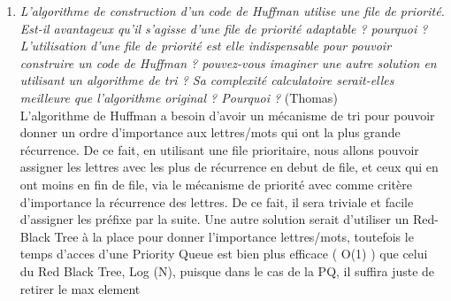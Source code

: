 \documentclass[11pt]{article}
\begin{document}
\begin{enumerate}
\item \textit{L'algorithme de construction d'un code de Huffman utilise une file de priorité. Est-il avantageux qu'il s'agisse d'une file de priorité adaptable ? pourquoi ? L'utilisation d'une file de priorité est elle indispensable pour pouvoir construire un code de Huffman ? pouvez-vous imaginer une autre solution en utilisant un algorithme de tri ? Sa complexité calculatoire serait-elles meilleure que l'algorithme original ? Pourquoi ?} (Thomas) \\
L’algorithme de Huffman a besoin d’avoir un mécanisme de tri pour pouvoir donner un ordre d’importance aux lettres/mots qui ont la plus grande récurrence. De ce fait, en utilisant une file prioritaire, nous allons pouvoir assigner les lettres avec les plus de récurrence en debut de file, et ceux qui en ont moins en fin de file, via le mécanisme de priorité avec comme critère d’importance la récurrence des lettres. De ce fait, il sera triviale et facile d’assigner les préfixe par la suite. Une autre solution serait d’utiliser un Red-Black Tree à la place pour donner l’importance lettres/mots, toutefois le temps d’acces d’une Priority Queue est bien plus efficace ( O(1) ) que celui du Red Black Tree, Log (N), puisque dans le cas de la PQ, il suffira juste de retirer le max element


\end{enumerate}
\end{document}
